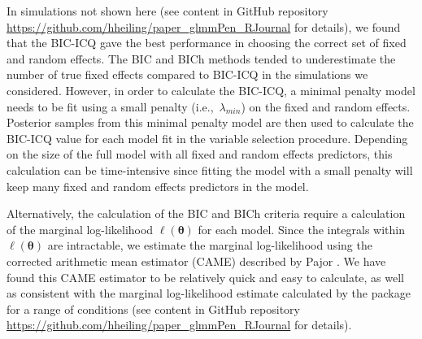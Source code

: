 
In simulations not shown here (see content in GitHub repository \url{https://github.com/hheiling/paper_glmmPen_RJournal} for details), we found that the BIC-ICQ gave the best performance in choosing the correct set of fixed and random effects. The BIC and BICh methods tended to underestimate the number of true fixed effects compared to BIC-ICQ in the simulations we considered. However, in order to calculate the BIC-ICQ, a minimal penalty model needs to be fit using a small penalty (i.e.,~$\lambda_{min}$) on the fixed and random effects. Posterior samples from this minimal penalty model are then used to calculate the BIC-ICQ value for each model fit in the variable selection procedure. Depending on the size of the full model with all fixed and random effects predictors, this calculation can be time-intensive since fitting the model with a small penalty will keep many fixed and random effects predictors in the model. 

Alternatively, the calculation of the BIC and BICh criteria require a calculation of the marginal log-likelihood \(\ell(\boldsymbol \theta)\) for each model. Since the integrals within \(\ell(\boldsymbol \theta)\) are intractable, we estimate the marginal log-likelihood using the corrected arithmetic mean estimator (CAME) described by Pajor \citeyearpar{pajor2017}. We have found this CAME estimator to be relatively quick and easy to calculate, as well as consistent with the marginal log-likelihood estimate calculated by the package  \citep{lme42007} for a range of conditions (see content in GitHub repository \url{https://github.com/hheiling/paper_glmmPen_RJournal} for details).


